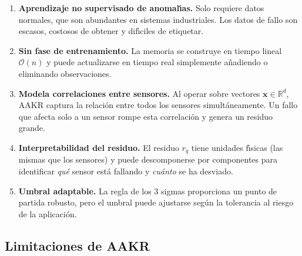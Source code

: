 \documentclass[12pt,a4paper]{article}
\begin{document}
\begin{enumerate}[leftmargin=2em]
  \item \textbf{Aprendizaje no supervisado de anomal\'{\i}as.} Solo requiere datos
        normales, que son abundantes en sistemas industriales. Los datos de fallo
        son escasos, costosos de obtener y dif\'{\i}ciles de etiquetar.

  \item \textbf{Sin fase de entrenamiento.} La memoria se construye en tiempo
        lineal $\mathcal{O}(n)$ y puede actualizarse en tiempo real simplemente
        a\~nadiendo o eliminando observaciones.

  \item \textbf{Modela correlaciones entre sensores.} Al operar sobre vectores
        $\mathbf{x} \in \mathbb{R}^d$, AAKR captura la relaci\'on entre todos los
        sensores simult\'aneamente. Un fallo que afecta solo a un sensor rompe esta
        correlaci\'on y genera un residuo grande.

  \item \textbf{Interpretabilidad del residuo.} El residuo $r_q$ tiene unidades
        f\'{\i}sicas (las mismas que los sensores) y puede descomponerse por componentes
        para identificar \emph{qu\'e} sensor est\'a fallando y \emph{cu\'anto} se ha
        desviado.

  \item \textbf{Umbral adaptable.} La regla de los 3 sigmas proporciona un punto
        de partida robusto, pero el umbral puede ajustarse seg\'un la tolerancia al
        riesgo de la aplicaci\'on.
\end{enumerate}

\subsection{Limitaciones de AAKR}
\end{document}
